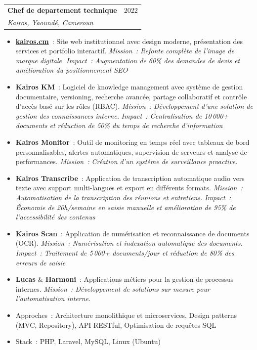 \documentclass[12pt, a4paper]{article}
\begin{document}
\vspace{6pt}
\noindent\begin{tabularx}{\linewidth}{@{}X r@{}}
  {\bfseries\color{primary}Chef de departement technique} &
  {\small\textcolor{textgray}{2022}} \\
  {\itshape\color{textgray}Kairos, Yaound\'e, Cameroun} & \\
\end{tabularx}
\begin{itemize}[leftmargin=1.4em, itemsep=1pt, topsep=2pt, parsep=0pt]
  \item \href{https://www.kairos.cm/}{\textbf{kairos.cm}}~: Site web institutionnel avec design moderne, pr\'esentation des services et portfolio interactif. \textit{Mission~: Refonte compl\`ete de l'image de marque digitale.} \textit{Impact~: Augmentation de 60\% des demandes de devis et am\'elioration du positionnement SEO}
  \item \textbf{Kairos KM}~: Logiciel de knowledge management avec syst\`eme de gestion documentaire, versioning, recherche avanc\'ee, partage collaboratif et contr\^ole d'acc\`es bas\'e sur les r\^oles (RBAC). \textit{Mission~: D\'eveloppement d'une solution de gestion des connaissances interne.} \textit{Impact~: Centralisation de 10\,000+ documents et r\'eduction de 50\% du temps de recherche d'information}
  \item \textbf{Kairos Monitor}~: Outil de monitoring en temps r\'eel avec tableaux de bord personnalisables, alertes automatiques, supervision de serveurs et analyse de performances. \textit{Mission~: Cr\'eation d'un syst\`eme de surveillance proactive.}
  \item \textbf{Kairos Transcribe}~: Application de transcription automatique audio vers texte avec support multi-langues et export en diff\'erents formats. \textit{Mission~: Automatisation de la transcription des r\'eunions et entretiens.} \textit{Impact~: \'Economie de 20h/semaine en saisie manuelle et am\'elioration de 95\% de l'accessibilit\'e des contenus}
  \item \textbf{Kairos Scan}~: Application de num\'erisation et reconnaissance de documents (OCR). \textit{Mission~: Num\'erisation et indexation automatique des documents.} \textit{Impact~: Traitement de 5\,000+ documents/jour et r\'eduction de 80\% des erreurs de saisie}
  \item \textbf{Lucas} \& \textbf{Harmoni}~: Applications m\'etiers pour la gestion de processus internes. \textit{Mission~: D\'eveloppement de solutions sur mesure pour l'automatisation interne.}
  \item Approches~: Architecture monolithique et microservices, Design patterns (MVC, Repository), API RESTful, Optimisation de requ\^etes SQL
  \item Stack~: PHP, Laravel, MySQL, Linux (Ubuntu)
\end{itemize}
\end{document}
